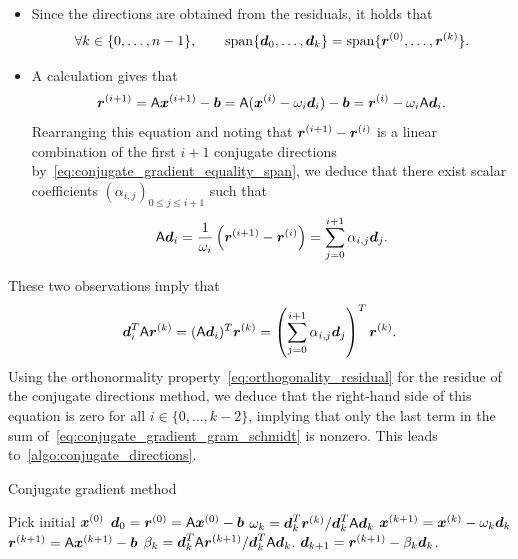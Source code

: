 \begin{itemize}
    \item
        Since the directions are obtained from the residuals,
        it holds that
        \begin{equation}
            \label{eq:conjugate_gradient_equality_span}
            \forall k \in \{0, \dotsc, n-1\}, \qquad
            \operatorname{span}\{ \mathbf{\boldsymbol{d}}_0, \dotsc, \mathbf{\boldsymbol{d}}_{k} \} =
            \operatorname{span}\{ \mathbf{\boldsymbol{r}}^{(0)}, \dotsc, \mathbf{\boldsymbol{r}}^{(k)} \}.
        \end{equation}

    \item
        A calculation gives that
        \begin{equation}
            \label{eq:conjugate_gradient_iteration_residual}
            \mathbf{\boldsymbol{r}}^{(i+1)}
            = \mathsf A \mathbf{\boldsymbol{x}}^{(i+1)} - \mathbf{\boldsymbol{b}}
            = \mathsf A(\mathbf{\boldsymbol{x}}^{(i)} - \omega_i \mathbf{\boldsymbol{d}}_i) - \mathbf{\boldsymbol{b}} = \mathbf{\boldsymbol{r}}^{(i)} - \omega_i \mathsf A \mathbf{\boldsymbol{d}}_i.
        \end{equation}
        Rearranging this equation and noting that $\mathbf{\boldsymbol{r}}^{(i+1)} - \mathbf{\boldsymbol{r}}^{(i)}$ is a linear combination of the first $i+1$ conjugate directions by~\eqref{eq:conjugate_gradient_equality_span},
        we deduce that there exist scalar coefficients $(\alpha_{i,j})_{0 \leq j \leq i+1}$ such that
        \[
            \mathsf A \mathbf{\boldsymbol{d}}_i
            = \frac{1}{\omega_i} \left( \mathbf{\boldsymbol{r}}^{(i+1)} - \mathbf{\boldsymbol{r}}^{(i)} \right)
            = \sum_{j=0}^{i+1} \alpha_{i,j} \mathbf{\boldsymbol{d}}_j.
        \]
\end{itemize}
These two observations imply that
\[
    \mathbf{\boldsymbol{d}}_i^T \mathsf A \mathbf{\boldsymbol{r}}^{(k)}
    = (\mathsf A \mathbf{\boldsymbol{d}}_i)^T \mathbf{\boldsymbol{r}}^{(k)}
    = \left(\sum_{j=0}^{i+1} \alpha_{i,j} \mathbf{\boldsymbol{d}}_j \right)^T \mathbf{\boldsymbol{r}}^{(k)}.
\]
Using the orthonormality property~\eqref{eq:orthogonality_residual} for the residue of the conjugate directions method,
we deduce that the right-hand side of this equation is zero for all $i \in \{0, \dotsc, k-2\}$,
implying that only the last term in the sum of~\eqref{eq:conjugate_gradient_gram_schmidt} is nonzero.
This leads to~\cref{algo:conjugate_directions}.
\begin{algorithm}
    \caption{Conjugate gradient method}%
    \label{algo:conjugate_gradient}%
    \begin{algorithmic}[1]
        \State Pick initial $\mathbf{\boldsymbol{x}}^{(0)}$
        \State $\mathbf{\boldsymbol{d}}_0 = \mathbf{\boldsymbol{r}}^{(0)} = \mathsf A \mathbf{\boldsymbol{x}}^{(0)} - \mathbf{\boldsymbol{b}}$
            \EndIf
            \State $\omega_k = \mathbf{\boldsymbol{d}}_k^T \mathbf{\boldsymbol{r}}^{(k)}/\mathbf{\boldsymbol{d}}_k^T \mathsf A \mathbf{\boldsymbol{d}}_k$
            \State $\mathbf{\boldsymbol{x}}^{(k+1)} = \mathbf{\boldsymbol{x}}^{(k)} - \omega_k \mathbf{\boldsymbol{d}}_k$
            \State $\mathbf{\boldsymbol{r}}^{(k+1)} = \mathsf A \mathbf{\boldsymbol{x}}^{(k+1)} - \mathbf{\boldsymbol{b}}$
            \State $\beta_k  = \mathbf{\boldsymbol{d}}_k^T \mathsf A \mathbf{\boldsymbol{r}}^{(k+1)}/\mathbf{\boldsymbol{d}}_k^T \mathsf A \mathbf{\boldsymbol{d}}_k$.
            \State $\mathbf{\boldsymbol{d}}_{k+1}  = \mathbf{\boldsymbol{r}}^{(k+1)} - \beta_k \mathbf{\boldsymbol{d}}_k$.
        \EndFor
    \end{algorithmic}
\end{algorithm}

